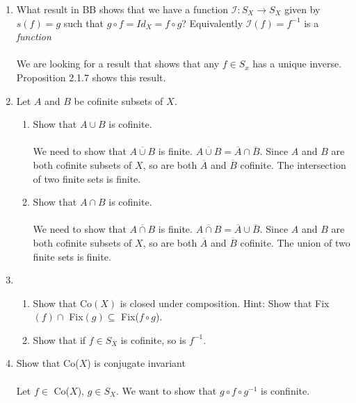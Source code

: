\documentclass[11pt]{article}
\begin{document}
\begin{enumerate}
\newpage
\item What result in BB shows that we have a function $\mathcal{I} : S_X \to S_X$ given by $s(f) = g$ such that $g \circ f = Id_X = f \circ g$? Equivalently $\mathcal{I}(f) = f^{-1}$ is a \emph{function}\\\\
We are looking for a result that shows that any $f \in S_x$ has a unique inverse.  Proposition 2.1.7 shows this result.

\newpage
\item Let $A$ and $B$ be cofinite subsets of $X$.\\
\begin{enumerate}
\item Show that $A \cup B$ is cofinite.\\\\
We need to show that $\overline{A \cup B}$ is finite.  $\overline{A \cup B} = \overline{A} \cap \overline{B}$. Since $A$ and $B$ are both cofinite subsets of $X$, so are both $\overline{A}$ and $\overline{B}$ cofinite.  The intersection of two finite sets is finite.
\item Show that $A \cap B$ is cofinite.\\\\
We need to show that $\overline{A \cap B}$ is finite.  $\overline{A \cap B} = \overline{A} \cup \overline{B}$. Since $A$ and $B$ are both cofinite subsets of $X$, so are both $\overline{A}$ and $\overline{B}$ cofinite.  The union of two finite sets is finite.
\end{enumerate}

\newpage
\item
\begin{enumerate}
\item Show that Co$(X)$ is closed under composition.  Hint: Show that Fix$(f) \cap$ Fix$(g) \subseteq$ Fix($f \circ g$).
\item Show that if $f \in S_X$ is cofinite, so is $f^{-1}$.
\end{enumerate}

\newpage
\item Show that Co($X$) is conjugate invariant
\\
\\
Let $f \in $ Co($X$), $g \in S_X$.  We want to show that $g \circ f \circ g^{-1}$ is confinite.\\


\end{enumerate}
\end{document}
